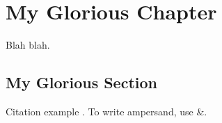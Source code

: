 \chapter{My Glorious Chapter}

Blah blah.

\section{My Glorious Section}

Citation example \cite[p.43]{TagToUseInLatexDocs}. To write ampersand, use
\&{}.

